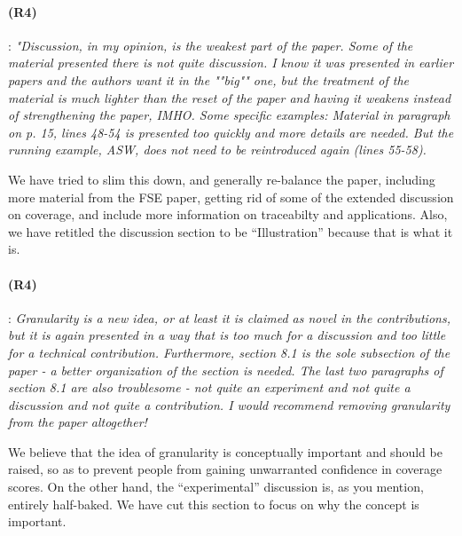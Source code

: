 \documentclass{article}
\begin{document}
\paragraph{(R4)}: \textit{"Discussion, in my opinion, is the weakest part of the paper. Some of the material presented there is not quite discussion. I know it was presented in earlier papers and the authors want it in the ""big"" one, but the treatment of the material is much lighter than the reset of the paper and having it weakens instead of strengthening the paper, IMHO. Some specific examples: Material in paragraph on p. 15, lines 48-54 is presented too quickly and more details are needed.  But the running example, ASW, does not need to be reintroduced again (lines 55-58).}
\vspace{0.05in}


We have tried to slim this down, and generally re-balance the paper, including more material from the FSE paper, getting rid of some of the extended discussion on coverage, and include more information on traceabilty and applications.  Also, we have retitled the discussion section to be ``Illustration'' because that is what it is.

\paragraph{(R4)}: \textit{Granularity is a new idea, or at least it is claimed as novel in the contributions, but it is again presented in a way that is too much for a discussion and too little for a technical contribution. Furthermore, section 8.1 is the sole subsection of the paper - a better organization of the section is needed.  The last two paragraphs of section 8.1 are also troublesome - not quite an experiment and not quite a discussion and not quite a contribution.  I would recommend removing granularity from the paper altogether!}
\vspace{0.05in}

We believe that the idea of granularity is conceptually important and should be raised, so as to prevent people from gaining unwarranted confidence in coverage scores.  On the other hand, the ``experimental'' discussion is, as you mention, entirely half-baked.  We have cut this section to focus on why the concept is important.

\end{document}
